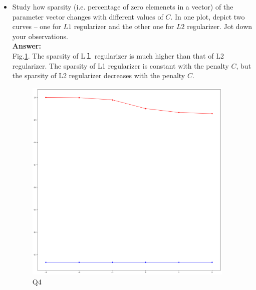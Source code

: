 \documentclass{article}
\begin{document}
\begin{itemize}
	\item Study how sparsity (i.e. percentage of zero elemenets in a vector) of the parameter vector changes with different values of $C$. In one plot, depict two curves -- one for $L1$ regularizer and the other one for $L2$ regularizer. Jot down your observations.
	\\\textbf{Answer:}\\
	Fig.\ref{fig:q4}. The sparsity of L１ regularizer is much higher than that of L2 regularizer. The sparsity of L1 regularizer is constant with the penalty $C$, but the sparsity of L2 regularizer decreases with the penalty $C$.
	
	\begin{figure}[!h]
		\centering
		\includegraphics[width=10cm]{./Python/result2.png}
		\caption{Q4}
		\label{fig:q4}
	\end{figure}
	
\end{itemize}

\newpage
\end{document}
